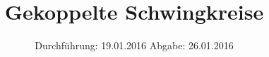 

\subject{Versuch: 355}
\title{Gekoppelte Schwingkreise}
\date{
  Durchführung: 19.01.2016
  \hspace{3em}
  Abgabe: 26.01.2016
}



\maketitle
\thispagestyle{empty}
\tableofcontents
\newpage






\printbibliography


